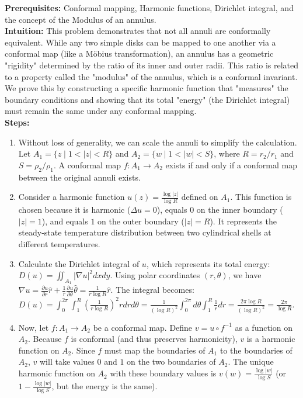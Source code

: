 \begin{solution}
\textbf{Prerequisites:} Conformal mapping, Harmonic functions, Dirichlet integral, and the concept of the Modulus of an annulus. \\[1em]
\textbf{Intuition:} This problem demonstrates that not all annuli are conformally equivalent. While any two simple disks can be mapped to one another via a conformal map (like a Möbius transformation), an annulus has a geometric "rigidity" determined by the ratio of its inner and outer radii. This ratio is related to a property called the "modulus" of the annulus, which is a conformal invariant. We prove this by constructing a specific harmonic function that "measures" the boundary conditions and showing that its total "energy" (the Dirichlet integral) must remain the same under any conformal mapping. \\[1em]
\textbf{Steps:}
\begin{enumerate}
    \item Without loss of generality, we can scale the annuli to simplify the calculation. Let $A_1 = \{z \mid 1 < |z| < R\}$ and $A_2 = \{w \mid 1 < |w| < S\}$, where $R = r_2/r_1$ and $S = \rho_2/\rho_1$. A conformal map $f: A_1 \to A_2$ exists if and only if a conformal map between the original annuli exists.

    \item Consider a harmonic function $u(z) = \frac{\log|z|}{\log R}$ defined on $A_1$. This function is chosen because it is harmonic ($\Delta u = 0$), equals $0$ on the inner boundary ($|z|=1$), and equals $1$ on the outer boundary ($|z|=R$). It represents the steady-state temperature distribution between two cylindrical shells at different temperatures.

    \item Calculate the Dirichlet integral of $u$, which represents its total energy:
    $D(u) = \iint_{A_1} |\nabla u|^2 dx dy$.
    Using polar coordinates $(r, \theta)$, we have $\nabla u = \frac{\partial u}{\partial r} \hat{r} + \frac{1}{r} \frac{\partial u}{\partial \theta} \hat{\theta} = \frac{1}{r \log R} \hat{r}$.
    The integral becomes:
    $D(u) = \int_0^{2\pi} \int_1^R \left( \frac{1}{r \log R} \right)^2 r dr d\theta = \frac{1}{(\log R)^2} \int_0^{2\pi} d\theta \int_1^R \frac{1}{r} dr = \frac{2\pi \log R}{(\log R)^2} = \frac{2\pi}{\log R}$.

    \item Now, let $f: A_1 \to A_2$ be a conformal map. Define $v = u \circ f^{-1}$ as a function on $A_2$. Because $f$ is conformal (and thus preserves harmonicity), $v$ is a harmonic function on $A_2$. Since $f$ must map the boundaries of $A_1$ to the boundaries of $A_2$, $v$ will take values $0$ and $1$ on the two boundaries of $A_2$. The unique harmonic function on $A_2$ with these boundary values is $v(w) = \frac{\log|w|}{\log S}$ (or $1 - \frac{\log|w|}{\log S}$, but the energy is the same).


\end{enumerate}
\end{solution}
